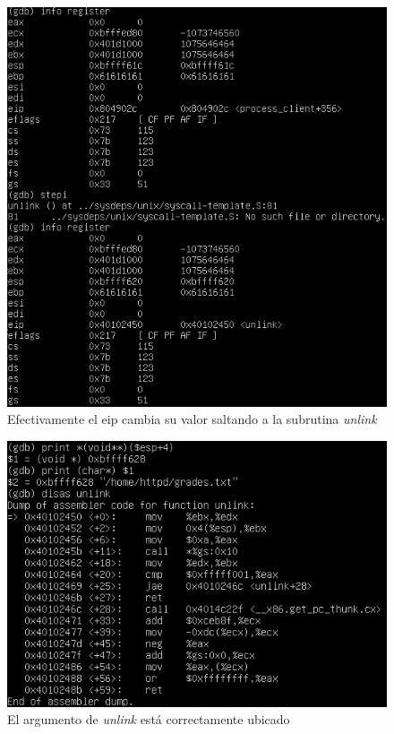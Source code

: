 \documentclass[12pt]{article}
\begin{document}
\begin{figure}[htp]
\centering
\includegraphics[scale=0.50]{./imagenes/ns1.png}
\caption{Efectivamente el eip cambia su valor saltando a la subrutina \textit{unlink}}
\end{figure}

\begin{figure}[htp]
\centering
\includegraphics[scale=0.7]{./imagenes/ns2.png}
\caption{El argumento de \textit{unlink} está correctamente ubicado}
\end{figure} 
\end{document}
